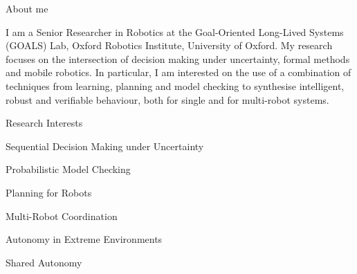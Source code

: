 
\begin{rSection}{About me}

I am a Senior Researcher in Robotics at the  Goal-Oriented Long-Lived Systems (GOALS) Lab, Oxford Robotics Institute, University of Oxford.
%
My research focuses on the intersection of decision making under uncertainty, formal methods and mobile robotics.
%
In particular, I am interested on the use of a combination of techniques from learning, planning and model checking to synthesise intelligent, robust and verifiable behaviour, both  for single and for multi-robot systems.


\begin{rSubsection}{Research Interests	}{}{}{}
\item Sequential Decision Making under Uncertainty
\item Probabilistic Model Checking
\item Planning for Robots
\item Multi-Robot Coordination
\item Autonomy in Extreme Environments
\item Shared Autonomy
\end{rSubsection}





\end{rSection}
